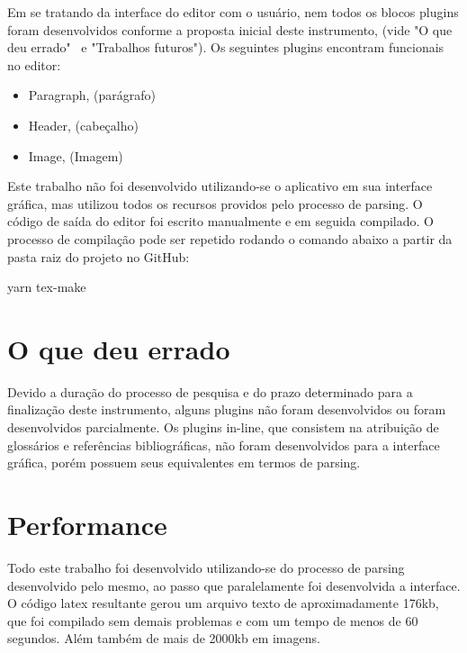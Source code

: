 Em se tratando da interface do editor com o usuário, nem todos os blocos plugins foram desenvolvidos
conforme a proposta inicial deste instrumento, (vide "O que deu errado"~ e "Trabalhos futuros").
Os seguintes plugins encontram funcionais no editor:

\begin{itemize}
        
	\item Paragraph, (parágrafo)
	\item Header, (cabeçalho)
	\item Image, (Imagem)
    
\end{itemize}

Este trabalho não foi desenvolvido utilizando-se o aplicativo em sua interface gráfica, mas utilizou todos os recursos providos pelo processo de parsing. O código de saída do editor foi escrito manualmente e em seguida compilado. O processo de compilação pode ser repetido rodando o comando abaixo a partir da pasta raiz do projeto no GitHub:

\begin{Codee9e414d87c954e8ca0b7c0b6e82105ce}
yarn tex-make
\end{Codee9e414d87c954e8ca0b7c0b6e82105ce}

\section{O que deu errado}

Devido a duração do processo de pesquisa e do prazo determinado para a finalização deste instrumento,
alguns plugins não foram desenvolvidos ou foram desenvolvidos parcialmente. Os plugins in-line, que consistem
na atribuição de glossários e referências bibliográficas, não foram desenvolvidos para a interface gráfica,
porém possuem seus equivalentes em termos de parsing.

\section{Performance}

Todo este trabalho foi desenvolvido utilizando-se do processo de parsing desenvolvido pelo mesmo, ao passo que
paralelamente foi desenvolvida a interface.
O código
\acrshort{latex}
resultante gerou um arquivo texto de aproximadamente 176kb, que foi compilado sem demais problemas
e com um tempo de menos de 60 segundos. Além também de mais de 2000kb em imagens.

